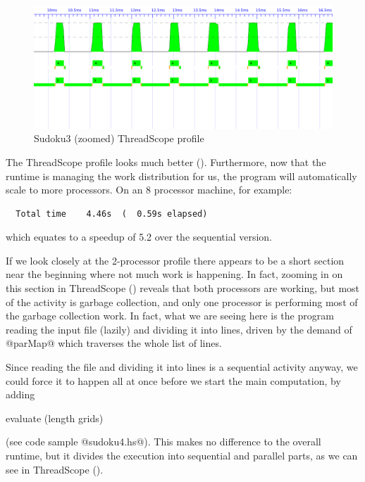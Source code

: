 \begin{figure}
\begin{center}
\includegraphics[scale=0.34]{sudoku3-zoom.png}
\end{center}
\caption{Sudoku3 (zoomed) ThreadScope profile}
\label{fig:sudoku3-zoom-threadscope}
\end{figure}

The ThreadScope profile looks much better
().  Furthermore, now that the runtime is
managing the work distribution for us, the program will automatically
scale to more processors.  On an 8 processor machine, for example:

{\small \begin{verbatim}
  Total time    4.46s  (  0.59s elapsed)
\end{verbatim}}

\noindent which equates to a speedup of 5.2 over the sequential
version.

If we look closely at the 2-processor profile there appears to be a
short section near the beginning where not much work is happening.  In
fact, zooming in on this section in ThreadScope
() reveals that both processors
are working, but most of the activity is garbage collection, and only
one processor is performing most of the garbage collection work.  In
fact, what we are seeing here is the program reading the input file
(lazily) and dividing it into lines, driven by the demand of @parMap@
which traverses the whole list of lines.

Since reading the file and dividing it into lines is a sequential
activity anyway, we could force it to happen all at once before we
start the main computation, by adding

\begin{haskell}
    evaluate (length grids)
\end{haskell}

\noindent (see code sample @sudoku4.hs@).  This makes no difference to
the overall runtime, but it divides the execution into sequential and
parallel parts, as we can see in ThreadScope
().


